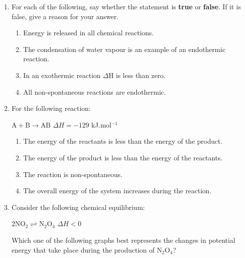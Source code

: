 \begin{eocexercises}{}

\begin{enumerate}
\item{For each of the following, say whether the statement is \textbf{true} or \textbf{false}. If it is false, give a reason for your answer.
\begin{enumerate}
\item{Energy is released in all chemical reactions.}
\item{The condensation of water vapour is an example of an endothermic reaction.}
\item{In an exothermic reaction $\Delta$H is less than zero.}
\item{All non-spontaneous reactions are endothermic.}
\end{enumerate}
}

\item{For the following reaction:

\begin{center}
$\text{A} + \text{B} \rightarrow \text{AB}$ $\Delta H = -129$ kJ.mol$^{-1}$
\end{center}
}
\begin{enumerate}
\item{The energy of the reactants is less than the energy of the product.}
\item{The energy of the product is less than the energy of the reactants.}
\item{The reaction is non-spontaneous.}
\item{The overall energy of the system increases during the reaction.}
\end{enumerate}

\item{Consider the following chemical equilibrium:

\begin{center}
$2\text{NO}_{2} \rightleftharpoons \text{N}_{2}\text{O}_{4}$  $\Delta H < 0$
\end{center}

Which one of the following graphs best represents the changes in potential energy that take place during the production of N$_{2}$O$_{4}$?}\\


\end{enumerate}
\end{eocexercises}
